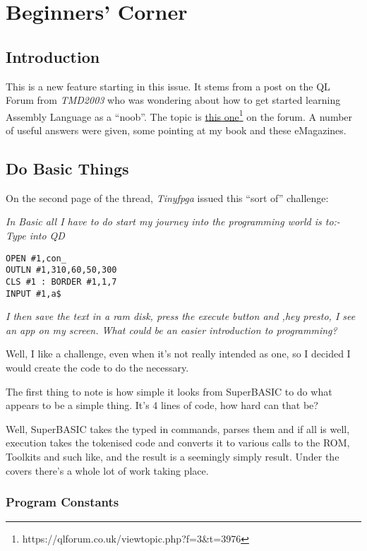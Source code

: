 
\chapter{Beginners' Corner}

\section{Introduction}

This is a new feature starting in this issue. It stems from a post
on the QL Forum from \emph{TMD2003} who was wondering about how to
get started learning Assembly Language as a ``noob''. The topic
is \href{https://qlforum.co.uk/viewtopic.php?f=3&t=3976}{this one}\footnote{https://qlforum.co.uk/viewtopic.php?f=3\&t=3976}
on the forum. A number of useful answers were given, some pointing
at my book and these eMagazines. 

\section{Do Basic Things}

On the second page of the thread, \emph{Tinyfpga} issued this ``sort
of'' challenge:

\emph{In Basic all I have to do start my journey into the programming
world is to:- Type into QD}

\begin{lstlisting}
OPEN #1,con_ 
OUTLN #1,310,60,50,300 
CLS #1 : BORDER #1,1,7 
INPUT #1,a$
\end{lstlisting}

\emph{I then save the text in a ram disk, press the execute button
and ,\textquotedbl hey presto\textquotedbl , I see an app on my
screen. What could be an easier introduction to programming?}

Well, I like a challenge, even when it's not really intended as one,
so I decided I would create the code to do the necessary.

The first thing to note is how simple it looks from SuperBASIC to
do what appears to be a simple thing. It's 4 lines of code, how hard
can that be?

Well, SuperBASIC takes the typed in commands, parses them and if all
is well, execution takes the tokenised code and converts it to various
calls to the ROM, Toolkits and such like, and the result is a seemingly
simply result. Under the covers there's a whole lot of work taking
place.

\subsection{Program Constants}

